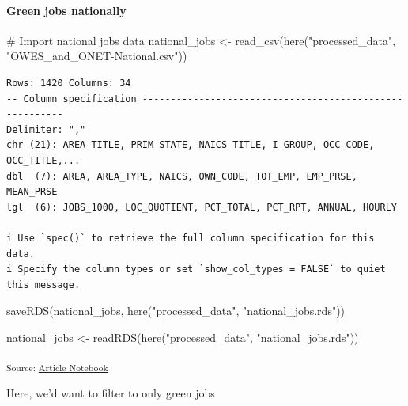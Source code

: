 \documentclass[
  letterpaper,
  DIV=11,
  numbers=noendperiod]{scrartcl}
\let\oldparagraph\paragraph
\renewcommand{\paragraph}[1]{\oldparagraph{#1}\mbox{}}
\newenvironment{Shaded}{\begin{snugshade}}{\end{snugshade}}
\newcommand{\CommentTok}[1]{\textcolor[rgb]{0.37,0.37,0.37}{#1}}
\newcommand{\FunctionTok}[1]{\textcolor[rgb]{0.28,0.35,0.67}{#1}}
\newcommand{\NormalTok}[1]{\textcolor[rgb]{0.00,0.23,0.31}{#1}}
\newcommand{\OtherTok}[1]{\textcolor[rgb]{0.00,0.23,0.31}{#1}}
\newcommand{\StringTok}[1]{\textcolor[rgb]{0.13,0.47,0.30}{#1}}
\begin{document}
\paragraph{Green jobs nationally}\label{green-jobs-nationally}

\begin{Shaded}
\begin{Highlighting}[]
\CommentTok{\# Import national jobs data}
\NormalTok{national\_jobs }\OtherTok{\textless{}{-}} \FunctionTok{read\_csv}\NormalTok{(}\FunctionTok{here}\NormalTok{(}\StringTok{"processed\_data"}\NormalTok{, }\StringTok{"OWES\_and\_ONET{-}National.csv"}\NormalTok{))}
\end{Highlighting}
\end{Shaded}

\begin{verbatim}
Rows: 1420 Columns: 34
-- Column specification --------------------------------------------------------
Delimiter: ","
chr (21): AREA_TITLE, PRIM_STATE, NAICS_TITLE, I_GROUP, OCC_CODE, OCC_TITLE,...
dbl  (7): AREA, AREA_TYPE, NAICS, OWN_CODE, TOT_EMP, EMP_PRSE, MEAN_PRSE
lgl  (6): JOBS_1000, LOC_QUOTIENT, PCT_TOTAL, PCT_RPT, ANNUAL, HOURLY

i Use `spec()` to retrieve the full column specification for this data.
i Specify the column types or set `show_col_types = FALSE` to quiet this message.
\end{verbatim}

\begin{Shaded}
\begin{Highlighting}[]
\FunctionTok{saveRDS}\NormalTok{(national\_jobs, }\FunctionTok{here}\NormalTok{(}\StringTok{"processed\_data"}\NormalTok{, }\StringTok{"national\_jobs.rds"}\NormalTok{))}

\NormalTok{national\_jobs  }\OtherTok{\textless{}{-}} \FunctionTok{readRDS}\NormalTok{(}\FunctionTok{here}\NormalTok{(}\StringTok{"processed\_data"}\NormalTok{, }\StringTok{"national\_jobs.rds"}\NormalTok{))}
\end{Highlighting}
\end{Shaded}

\textsubscript{Source:
\href{https://beeckcenter.github.io/climate-equity-workforce/index-preview.html}{Article
Notebook}}

Here, we'd want to filter to only green jobs
\end{document}

